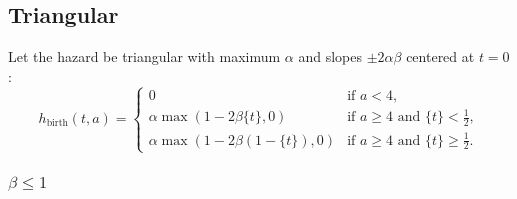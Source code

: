 \documentclass{article}
\begin{document}
\subsection{Triangular}

Let the hazard be triangular with maximum $\alpha$ and slopes
$\pm 2 \alpha \beta$ centered at $t = 0$:
\begin{equation}
  h_{\text{birth}} (t, a) =
  \begin{cases}
    0 & \text{if $a < 4$},
    \\
    \alpha \max\left(1 - 2 \beta \{t\}, 0\right)
    & \text{if $a \geq 4$ and $\{t\} < \frac{1}{2}$},
    \\
    \alpha \max\left(1 - 2 \beta (1 - \{t\}), 0\right)
    & \text{if $a \geq 4$ and $\{t\} \geq \frac{1}{2}$}.
  \end{cases}
\end{equation}

\subsubsection{$\beta \leq 1$}
\end{document}
